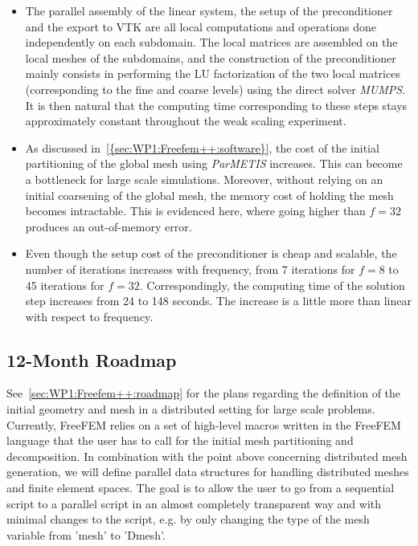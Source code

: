 \begin{itemize}
\item The parallel assembly of the linear system, the setup of the preconditioner and the export to VTK are all local computations and operations done independently on each subdomain. The local matrices are assembled on the local meshes of the subdomains, and the construction of the preconditioner mainly consists in performing the LU factorization of the two local matrices (corresponding to the fine and coarse levels) using the direct solver \textit{MUMPS}. It is then natural that the computing time corresponding to these steps stays approximately constant throughout the weak scaling experiment.
\item As discussed in~\cref{{sec:WP1:Freefem++:software}}, the cost of the initial partitioning of the global mesh using \textit{ParMETIS} increases. This can become a bottleneck for large scale simulations. Moreover, without relying on an initial coarsening of the global mesh, the memory cost of holding the mesh becomes intractable. This is evidenced here, where going higher than $f=32$ produces an out-of-memory error.
\item Even though the setup cost of the preconditioner is cheap and scalable, the number of iterations increases with frequency, from 7 iterations for $f=8$ to 45 iterations for $f=32$. Correspondingly, the computing time of the solution step increases from 24 to 148 seconds. The increase is a little more than linear with respect to frequency.
\end{itemize}

\subsection{12-Month Roadmap}
\label{sec:WP3:Freefem++:roadmap}

See~\cref{sec:WP1:Freefem++:roadmap} for the plans regarding the definition of the initial geometry and mesh in a distributed setting for large scale problems.\\

Currently, FreeFEM relies on a set of high-level macros written in the FreeFEM language that the user has to call for the initial mesh partitioning and decomposition. In combination with the point above concerning distributed mesh generation, we will define parallel data structures for handling distributed meshes and finite element spaces. The goal is to allow the user to go from a sequential script to a parallel script in an almost completely transparent way and with minimal changes to the script, e.g. by only changing the type of the mesh variable from 'mesh' to 'Dmesh'.\\

